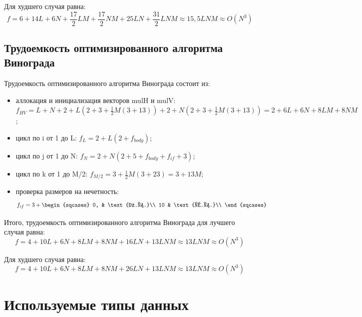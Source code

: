 Для худшего случая равна:
\begin{equation}
	f = 6 + 14L + 6N + \frac{17}{2}LM + \frac{17}{2}NM + 25LN + \frac{31}{2}LNM \approx 15,5LNM \approx O(N^3)
\end{equation}

\subsection{Трудоемкость оптимизированного алгоритма Винограда}

Трудоемкость оптимизированного алгоритма Винограда состоит из:
\begin{itemize}
    \item аллокация и инициализация векторов mulH и mulV: $f_{HV} = L + N + 2 + L(2 + 3 + \frac{1}{2}M(3 + 13)) + 2 + N(2 + 3 + \frac{1}{2}M(3 + 13)) = 2 + 6L + 6N + 8LM + 8NM$;
    \item цикл по i от 1 до L: $f_{L} = 2 + L(2 + f_{body})$;
    \item цикл по j от 1 до N: $f_{N} = 2 + N(2 + 5 + f_{body} + f_{if} + 3)$;
    \item цикл по k от 1 до M/2: $f_{M/2} = 3 + \frac{1}{2}M(3 + 23) = 3 + 13M$;
    \item проверка размеров на нечетность:
    \begin{equation}
    	f_{if} = 3 + \begin{sqcases}
    			0, & \text{л.с.}\\
    			10 & \text{х.с.}\\
    		\end{sqcases}
    \end{equation}
\end{itemize} 

\newpage
Итого, трудоемкость оптимизированного алгоритма Винограда для лучшего случая равна:
\begin{equation}
	f = 4 + 10L + 6N + 8LM + 8NM + 16LN + 13LNM \approx 13LNM \approx O(N^3)
\end{equation}

Для худшего случая равна:
\begin{equation}
	f = 4 + 10L + 6N + 8LM + 8NM + 26LN + 13LNM \approx 13LNM \approx O(N^3)
\end{equation}

\section{Используемые типы данных}

